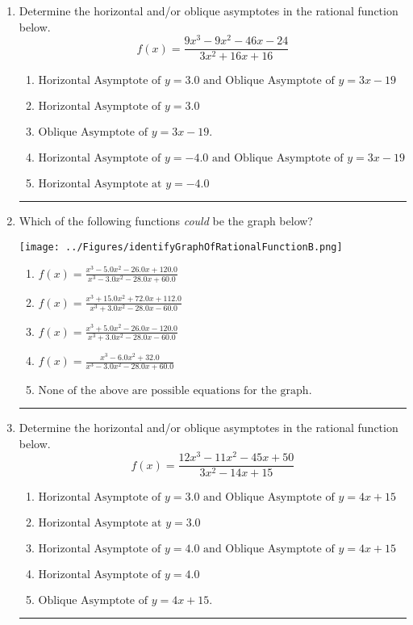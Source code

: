 \documentclass[14pt]{extbook}
\newcommand{\litem}[1]{\item#1\hspace*{-1cm}\rule{\textwidth}{0.4pt}}
\begin{document}
\begin{enumerate}
{\begin{enumerate}[label=\Alph*.]
\end{enumerate} }
\litem{
Determine the horizontal and/or oblique asymptotes in the rational function below.\[ f(x) = \frac{9x^{3} -9 x^{2} -46 x -24}{3x^{2} +16 x + 16} \]\begin{enumerate}[label=\Alph*.]
\item \( \text{Horizontal Asymptote of } y = 3.0 \text{ and Oblique Asymptote of } y = 3x -19 \)
\item \( \text{Horizontal Asymptote of } y = 3.0  \)
\item \( \text{Oblique Asymptote of } y = 3x -19. \)
\item \( \text{Horizontal Asymptote of } y = -4.0 \text{ and Oblique Asymptote of } y = 3x -19 \)
\item \( \text{Horizontal Asymptote at } y = -4.0 \)

\end{enumerate} }
\litem{
Which of the following functions \textit{could} be the graph below?
\begin{center}
    \texttt{[image: ../Figures/identifyGraphOfRationalFunctionB.png]}
\end{center}
\begin{enumerate}[label=\Alph*.]
\item \( f(x)=\frac{x^{3} -5.0 x^{2} -26.0 x + 120.0}{x^{3} -3.0 x^{2} -28.0 x + 60.0} \)
\item \( f(x)=\frac{x^{3} +15.0 x^{2} +72.0 x + 112.0}{x^{3} +3.0 x^{2} -28.0 x -60.0} \)
\item \( f(x)=\frac{x^{3} +5.0 x^{2} -26.0 x -120.0}{x^{3} +3.0 x^{2} -28.0 x -60.0} \)
\item \( f(x)=\frac{x^{3} -6.0 x^{2} + 32.0}{x^{3} -3.0 x^{2} -28.0 x + 60.0} \)
\item \( \text{None of the above are possible equations for the graph.} \)

\end{enumerate} }
\litem{
Determine the horizontal and/or oblique asymptotes in the rational function below.\[ f(x) = \frac{12x^{3} -11 x^{2} -45 x + 50}{3x^{2} -14 x + 15} \]\begin{enumerate}[label=\Alph*.]
\item \( \text{Horizontal Asymptote of } y = 3.0 \text{ and Oblique Asymptote of } y = 4x + 15 \)
\item \( \text{Horizontal Asymptote at } y = 3.0 \)
\item \( \text{Horizontal Asymptote of } y = 4.0 \text{ and Oblique Asymptote of } y = 4x + 15 \)
\item \( \text{Horizontal Asymptote of } y = 4.0  \)
\item \( \text{Oblique Asymptote of } y = 4x + 15. \)


\end{enumerate}}
\end{enumerate}
\end{document}
